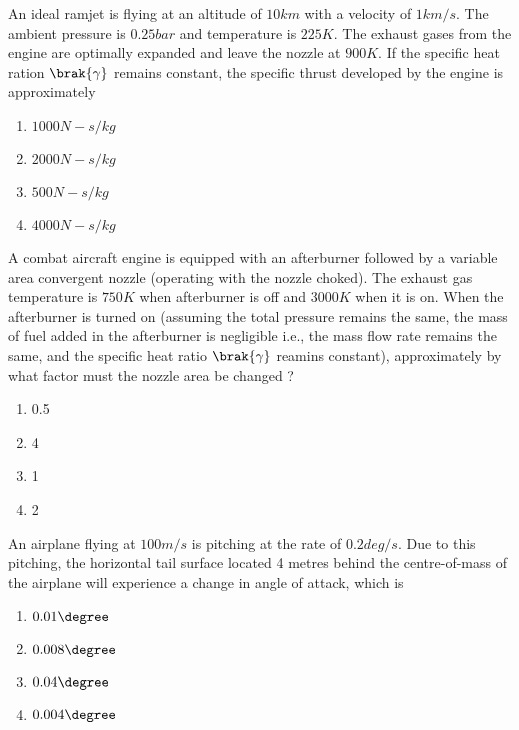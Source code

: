 \iffalse	
	\chapter{2009}
	\author{AI24BTECH11016}
	\section{ae}
\fi

\item
	An ideal ramjet is flying at an altitude of $10 km$ with a velocity of $1 km/s$. The ambient pressure is $0.25 bar$ and temperature is $225 K$. The exhaust gases from the engine are optimally expanded and leave the nozzle at $900 K$. If the specific heat ration $\brak{\gamma}$ remains constant, the specific thrust developed by the engine is approximately
		\begin{enumerate}
			\item $1000 N-s/kg$
			\item $2000 N-s/kg$
			\item $500 N-s/kg$
			\item $4000 N-s/kg$
		\end{enumerate}
	\item
	A combat aircraft engine is equipped with an afterburner followed by a variable area convergent nozzle (operating with the nozzle choked). The exhaust gas temperature is $750 K$ when afterburner is off and $3000 K$ when it is on. When the afterburner is turned on (assuming the total pressure remains the same, the mass of fuel added in the afterburner is negligible i.e., the mass flow rate remains the same, and the specific heat ratio $\brak{\gamma}$ reamins constant), approximately by what factor must the nozzle area be changed ?
		\begin{enumerate}
			\item 0.5
			\item 4
			\item 1
			\item 2
		\end{enumerate}
	\item
	An airplane flying at $100 m/s$ is pitching at the rate of $0.2 deg/s$. Due to this pitching, the horizontal tail surface located 4 metres behind the centre-of-mass of the airplane will experience a change in angle of attack, which is
		\begin{enumerate}
			\item $0.01 \degree$
			\item $0.008 \degree$
			\item $0.04 \degree$
			\item $0.004 \degree$
		\end{enumerate}
